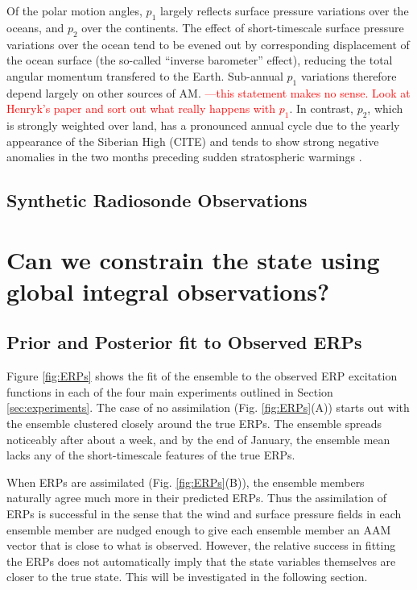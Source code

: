 \documentclass[draft,jgrga]{agutex}
\begin{document}
\begin{article}
Of the polar motion angles, $p_1$ largely reflects surface pressure variations over the oceans, and $p_2$ over the continents.
The effect of short-timescale surface pressure variations over the ocean tend to be evened out by corresponding displacement of the ocean surface (the so-called ``inverse barometer'' effect), reducing the total angular momentum transfered to the Earth.  
Sub-annual $p_1$ variations therefore depend largely on other sources of AM.
\textcolor{red}{---this statement makes no sense.  Look at Henryk's paper and sort out what really happens with $p_1$}.
In contrast, $p_2$, which is strongly weighted over land, has a pronounced annual cycle due to the yearly appearance of the Siberian High (CITE) and tends to show strong negative anomalies in the two months preceding sudden stratospheric warmings \citep[in preparation]{neefmatthes2013sub}.


\subsection{Synthetic Radiosonde Observations}






\section{Can we constrain the state using global integral observations?}

\subsection{Prior and Posterior fit to Observed ERPs}
Figure \ref{fig:ERPs} shows the fit of the ensemble to the observed ERP excitation functions in each of the four main experiments outlined in Section \ref{sec:experiments}.
The case of no assimilation (Fig. \ref{fig:ERPs}(A)) starts out with the ensemble clustered closely around the true ERPs.
The ensemble spreads noticeably after about a week, and by the end of January, the ensemble mean lacks any of the short-timescale features of the true ERPs.

When ERPs are assimilated (Fig. \ref{fig:ERPs}(B)), the ensemble members naturally agree much more in their predicted ERPs.  
Thus the assimilation of ERPs is successful in the sense that the wind and surface pressure fields in each ensemble member are nudged enough to give each ensemble member an AAM vector that is close to what is observed.
However, the relative success in fitting the ERPs does not automatically imply that the state variables themselves are closer to the true state.  
This will be investigated in the following section.


\end{article}
\end{document}
